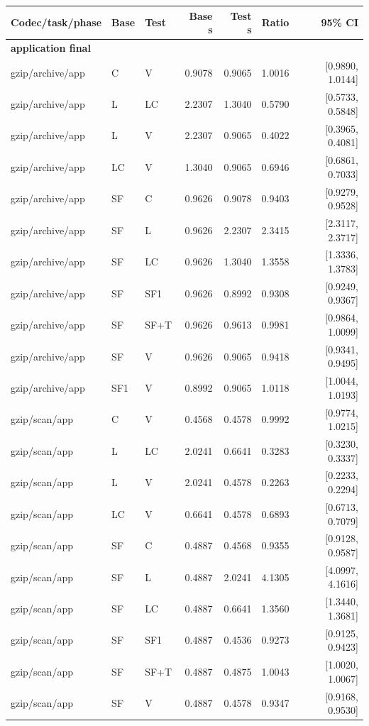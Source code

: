 \begin{longtable}{lllrrrr}
\toprule
Codec/task/phase & Base & Test & Base s & Test s & Ratio & 95\% CI \\
\midrule\endhead
\multicolumn{7}{l}{\textbf{application final}} \\
gzip/archive/app & C & V & 0.9078 & 0.9065 & 1.0016 & [0.9890, 1.0144] \\
gzip/archive/app & L & LC & 2.2307 & 1.3040 & 0.5790 & [0.5733, 0.5848] \\
gzip/archive/app & L & V & 2.2307 & 0.9065 & 0.4022 & [0.3965, 0.4081] \\
gzip/archive/app & LC & V & 1.3040 & 0.9065 & 0.6946 & [0.6861, 0.7033] \\
gzip/archive/app & SF & C & 0.9626 & 0.9078 & 0.9403 & [0.9279, 0.9528] \\
gzip/archive/app & SF & L & 0.9626 & 2.2307 & 2.3415 & [2.3117, 2.3717] \\
gzip/archive/app & SF & LC & 0.9626 & 1.3040 & 1.3558 & [1.3336, 1.3783] \\
gzip/archive/app & SF & SF1 & 0.9626 & 0.8992 & 0.9308 & [0.9249, 0.9367] \\
gzip/archive/app & SF & SF+T & 0.9626 & 0.9613 & 0.9981 & [0.9864, 1.0099] \\
gzip/archive/app & SF & V & 0.9626 & 0.9065 & 0.9418 & [0.9341, 0.9495] \\
gzip/archive/app & SF1 & V & 0.8992 & 0.9065 & 1.0118 & [1.0044, 1.0193] \\
gzip/scan/app & C & V & 0.4568 & 0.4578 & 0.9992 & [0.9774, 1.0215] \\
gzip/scan/app & L & LC & 2.0241 & 0.6641 & 0.3283 & [0.3230, 0.3337] \\
gzip/scan/app & L & V & 2.0241 & 0.4578 & 0.2263 & [0.2233, 0.2294] \\
gzip/scan/app & LC & V & 0.6641 & 0.4578 & 0.6893 & [0.6713, 0.7079] \\
gzip/scan/app & SF & C & 0.4887 & 0.4568 & 0.9355 & [0.9128, 0.9587] \\
gzip/scan/app & SF & L & 0.4887 & 2.0241 & 4.1305 & [4.0997, 4.1616] \\
gzip/scan/app & SF & LC & 0.4887 & 0.6641 & 1.3560 & [1.3440, 1.3681] \\
gzip/scan/app & SF & SF1 & 0.4887 & 0.4536 & 0.9273 & [0.9125, 0.9423] \\
gzip/scan/app & SF & SF+T & 0.4887 & 0.4875 & 1.0043 & [1.0020, 1.0067] \\
gzip/scan/app & SF & V & 0.4887 & 0.4578 & 0.9347 & [0.9168, 0.9530] \\

\end{longtable}
